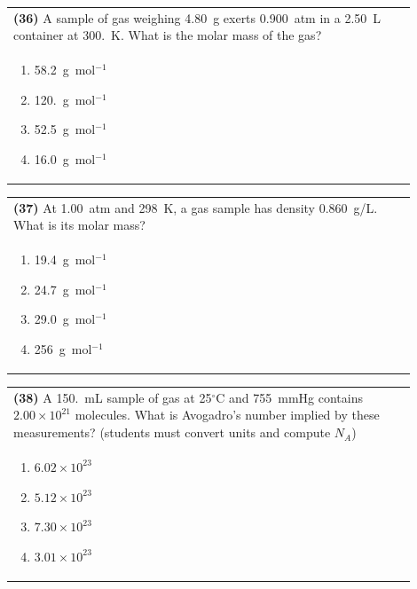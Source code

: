 \documentclass{article}
\begin{document}
\vspace{0.2cm}
\noindent\begin{tabular}{|p{0.9\linewidth}|}
\hline
\textbf{(36)} A sample of gas weighing 4.80~g exerts 0.900~atm in a 2.50~L container at 300.~K. What is the molar mass of the gas? \\[0.2cm]

\begin{minipage}[t]{0.85\linewidth}
\begin{enumerate}[label=\alph*.]
\item 58.2~g~mol$^{-1}$
\item 120.~g~mol$^{-1}$
\item 52.5~g~mol$^{-1}$
\item 16.0~g~mol$^{-1}$
\end{enumerate}
\end{minipage}\\[0.2cm]
\hline
\end{tabular}

\newpage

\noindent\begin{tabular}{|p{0.9\linewidth}|}
\hline
\textbf{(37)} At 1.00~atm and 298~K, a gas sample has density 0.860~g/L. What is its molar mass?\\[0.2cm]

\begin{minipage}[t]{0.85\linewidth}
\begin{enumerate}[label=\alph*.]
\item 19.4~g~mol$^{-1}$
\item 24.7~g~mol$^{-1}$
\item 29.0~g~mol$^{-1}$
\item 256~g~mol$^{-1}$
\end{enumerate}
\end{minipage}\\[0.2cm]
\hline
\end{tabular}

\vspace{0.2cm}
\noindent\begin{tabular}{|p{0.9\linewidth}|}
\hline
\textbf{(38)} A 150.~mL sample of gas at 25$^\circ$C and 755~mmHg contains $2.00\times10^{21}$ molecules. What is Avogadro's number implied by these measurements? (students must convert units and compute $N_A$)\\[0.2cm]

\begin{minipage}[t]{0.85\linewidth}
\begin{enumerate}[label=\alph*.]
\item $6.02\times10^{23}$
\item $5.12\times10^{23}$
\item $7.30\times10^{23}$
\item $3.01\times10^{23}$
\end{enumerate}
\end{minipage}\\[0.2cm]
\hline
\end{tabular}
\end{document}
